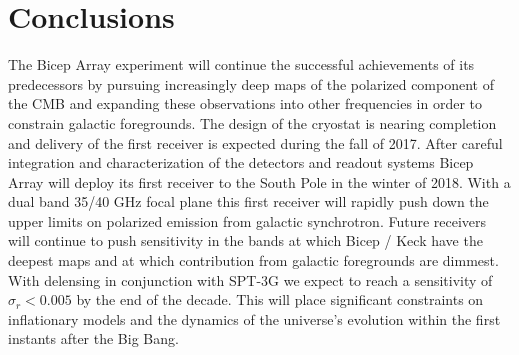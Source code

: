 \documentclass[12pt]{article}
\begin{document}
\section{Conclusions}
The Bicep Array experiment will continue the successful achievements of its
predecessors by pursuing increasingly deep maps of the polarized component of
the CMB and expanding these observations into other frequencies in order to
constrain galactic foregrounds. The design of the cryostat is nearing
completion and delivery of the first receiver is expected during the fall of
2017. After careful integration and characterization of the detectors and
readout systems Bicep Array will deploy its first receiver to the South Pole
in the winter of 2018. With a dual band 35/40 GHz focal plane this first
receiver will rapidly push down the upper limits on polarized emission from
galactic synchrotron. Future receivers will continue to push sensitivity in
the bands at which Bicep / Keck have the deepest maps and at which
contribution from galactic foregrounds are dimmest. With delensing in
conjunction with SPT-3G we expect to reach a sensitivity of $\sigma _r <
0.005$ by the end of the decade. This will place significant constraints on
inflationary models and the dynamics of the universe's evolution within the
first instants after the Big Bang.










\printbibliography
\end{document}
